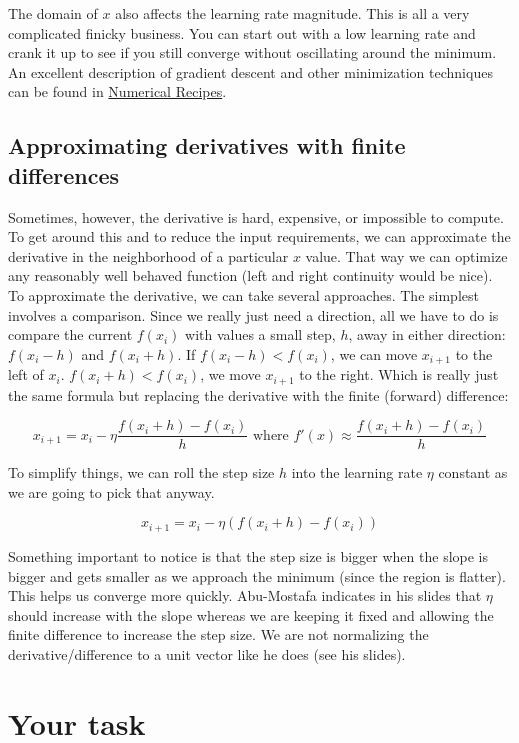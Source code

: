 \begin{fullwidth}
The domain of $x$ also affects the learning rate magnitude. This is all a very complicated finicky business. You can start out with a low learning rate and crank it up to see if you still converge without oscillating around the minimum.  \noindent An excellent description of gradient descent and other minimization techniques can be found in \href{http://apps.nrbook.com/fortran/index.html}{Numerical Recipes}.

\subsection{Approximating derivatives with finite differences}

Sometimes, however, the derivative is hard, expensive, or impossible to compute.  To get around this and to reduce the input requirements, we can approximate the derivative in the neighborhood of a particular $x$ value. That way we can optimize any reasonably well behaved function (left and right continuity would be nice). To approximate the derivative, we can take several approaches. The simplest involves a comparison. Since we really just need a direction, all we have to do is compare the current $f(x_i)$ with values a small step, $h$, away in either direction: $f(x_{i}-h)$ and $f(x_{i}+h)$.  If $f(x_{i}-h) < f(x_{i})$, we can move $x_{i+1}$ to the left of $x_{i}$. $f(x_{i}+h) < f(x_{i})$, we move $x_{i+1}$ to the right.  Which is really just the same formula but replacing the derivative with the finite (forward) difference:

\[
x _{i+1} = x_i - \eta \frac{f(x_{i}+h) - f(x_{i})}{h} \text{ where } f'(x) \approx \frac{f(x_{i}+h) - f(x_{i})}{h}
\]

\noindent To simplify things, we can roll the step size $h$ into the learning rate $\eta$ constant as we are going to pick that anyway.

\[
x _{i+1} = x_i - \eta (f(x_{i}+h) - f(x_{i}))
\]

\noindent  Something important to notice is that the step size is bigger when the slope is bigger and gets smaller as we approach the minimum (since the region is flatter). This helps us converge more quickly. Abu-Mostafa indicates in his slides that $\eta$ should increase with the slope whereas we are keeping it fixed and allowing the finite difference to increase the step size. We are not normalizing the derivative/difference to a unit vector like he does (see his slides).

\section{Your task}


\end{fullwidth}
